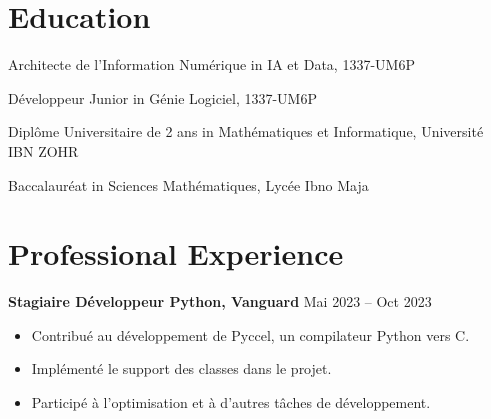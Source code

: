 \documentclass[a4paper,11pt]{article}%
\begin{document}
\section*{Education}%
\noindent{}\begin{minipage}[t]{\dimexpr\linewidth-3.5cm\relax}Architecte de l{\textquoteright}Information Num\'erique in IA et Data, 1337-UM6P\end{minipage}\par%
\noindent{}\begin{minipage}[t]{\dimexpr\linewidth-3.5cm\relax}D\'eveloppeur Junior in G\'enie Logiciel, 1337-UM6P\end{minipage}\par%
\noindent{}\begin{minipage}[t]{\dimexpr\linewidth-3.5cm\relax}Dipl\^ome Universitaire de 2 ans in Math\'ematiques et Informatique, Universit\'e IBN ZOHR\end{minipage}\par%
\noindent{}\begin{minipage}[t]{\dimexpr\linewidth-3.5cm\relax}Baccalaur\'eat in Sciences Math\'ematiques, Lyc\'ee Ibno Maja\end{minipage}\par%
\section*{Professional Experience}%
\textbf{Stagiaire D\'eveloppeur Python, Vanguard} \hfill Mai 2023 -- Oct 2023%
\begin{itemize}[leftmargin=*]%
\item Contribu\'e au d\'eveloppement de Pyccel, un compilateur Python vers C.%
\item Impl\'ement\'e le support des classes dans le projet.%
\item Particip\'e \`a l{\textquoteright}optimisation et \`a d{\textquoteright}autres t\^aches de d\'eveloppement.%
\end{itemize}%
%
\end{document}
